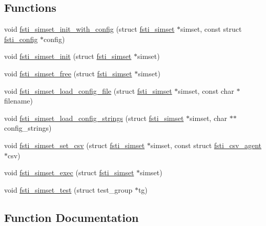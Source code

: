 \subsection*{Functions}
\begin{DoxyCompactItemize}
\item 
void \mbox{\hyperlink{fsti-simset_8c_a1cb3469742605ad3883f1b94f1f681ed}{fsti\+\_\+simset\+\_\+init\+\_\+with\+\_\+config}} (struct \mbox{\hyperlink{structfsti__simset}{fsti\+\_\+simset}} $\ast$simset, const struct \mbox{\hyperlink{structfsti__config}{fsti\+\_\+config}} $\ast$config)
\item 
void \mbox{\hyperlink{fsti-simset_8c_ae663244aa372d7aec96fc021986b5cd3}{fsti\+\_\+simset\+\_\+init}} (struct \mbox{\hyperlink{structfsti__simset}{fsti\+\_\+simset}} $\ast$simset)
\item 
void \mbox{\hyperlink{fsti-simset_8c_aea0fceda1ad3ad46c434837f7eee4fb4}{fsti\+\_\+simset\+\_\+free}} (struct \mbox{\hyperlink{structfsti__simset}{fsti\+\_\+simset}} $\ast$simset)
\item 
void \mbox{\hyperlink{fsti-simset_8c_a8635ad080108f9d35e1e0f01d9e7c855}{fsti\+\_\+simset\+\_\+load\+\_\+config\+\_\+file}} (struct \mbox{\hyperlink{structfsti__simset}{fsti\+\_\+simset}} $\ast$simset, const char $\ast$filename)
\item 
void \mbox{\hyperlink{fsti-simset_8c_ab81c9af7043163aa922dd03128d18f91}{fsti\+\_\+simset\+\_\+load\+\_\+config\+\_\+strings}} (struct \mbox{\hyperlink{structfsti__simset}{fsti\+\_\+simset}} $\ast$simset, char $\ast$$\ast$config\+\_\+strings)
\item 
void \mbox{\hyperlink{fsti-simset_8c_a08f81ac2f9dab77ce689ffb90499d4c5}{fsti\+\_\+simset\+\_\+set\+\_\+csv}} (struct \mbox{\hyperlink{structfsti__simset}{fsti\+\_\+simset}} $\ast$simset, const struct \mbox{\hyperlink{structfsti__csv__agent}{fsti\+\_\+csv\+\_\+agent}} $\ast$csv)
\item 
void \mbox{\hyperlink{fsti-simset_8c_ab874d71469d5e16d9dbff4aea5faf945}{fsti\+\_\+simset\+\_\+exec}} (struct \mbox{\hyperlink{structfsti__simset}{fsti\+\_\+simset}} $\ast$simset)
\item 
void \mbox{\hyperlink{fsti-simset_8c_a14d71a5961f0b595d706a5a43e7350d3}{fsti\+\_\+simset\+\_\+test}} (struct test\+\_\+group $\ast$tg)
\end{DoxyCompactItemize}


\subsection{Function Documentation}
\mbox{\label{fsti-simset_8c_ab874d71469d5e16d9dbff4aea5faf945}} 
